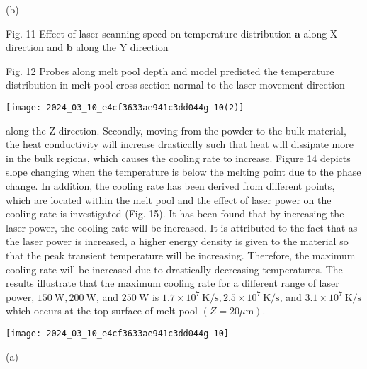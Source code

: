 \documentclass[10pt]{article}
\begin{document}
(b)

Fig. 11 Effect of laser scanning speed on temperature distribution $\mathbf{a}$ along $\mathrm{X}$ direction and $\mathbf{b}$ along the $\mathrm{Y}$ direction

Fig. 12 Probes along melt pool depth and model predicted the temperature distribution in melt pool cross-section normal to the laser movement direction

\begin{center}
\texttt{[image: 2024\_03\_10\_e4cf3633ae941c3dd044g-10(2)]}
\end{center}

along the $\mathrm{Z}$ direction. Secondly, moving from the powder to the bulk material, the heat conductivity will increase drastically such that heat will dissipate more in the bulk regions, which causes the cooling rate to increase. Figure 14 depicts slope changing when the temperature is below the melting point due to the phase change. In addition, the cooling rate has been derived from different points, which are located within the melt pool and the effect of laser power on the cooling rate is investigated (Fig. 15). It has been found that by increasing the laser power, the cooling rate will be increased. It is attributed to the fact that as the laser power is increased, a higher energy density is given to the material so that the peak transient temperature will be increasing. Therefore, the maximum cooling rate will be increased due to drastically decreasing temperatures. The results illustrate that the maximum cooling rate for a different range of laser power, $150 \mathrm{~W}, 200 \mathrm{~W}$, and $250 \mathrm{~W}$ is $1.7 \times 10^{7} \mathrm{~K} / \mathrm{s}, 2.5 \times 10^{7} \mathrm{~K} / \mathrm{s}$, and $3.1 \times 10^{7} \mathrm{~K} / \mathrm{s}$ which occurs at the top surface of melt pool $(Z=20 \mu \mathrm{m})$.

\begin{center}
\texttt{[image: 2024\_03\_10\_e4cf3633ae941c3dd044g-10]}
\end{center}

(a)
\end{document}
